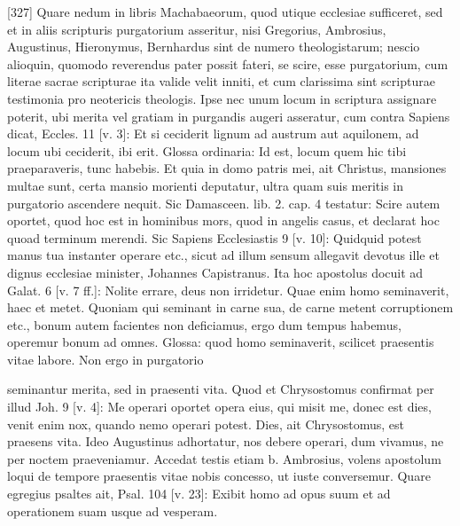 [327] Quare nedum in libris Machabaeorum, quod utique ecclesiae sufficeret, sed et in aliis scripturis purgatorium asseritur, nisi Gregorius, Ambrosius, Augustinus, Hieronymus, Bernhardus sint de numero theologistarum; nescio alioquin, quomodo reverendus pater possit fateri, se scire, esse purgatorium, cum literae sacrae scripturae ita valide velit inniti, et cum clarissima sint scripturae testimonia pro neotericis theologis. Ipse nec unum locum in scriptura assignare poterit, ubi merita vel gratiam in purgandis augeri asseratur, cum contra Sapiens dicat, Eccles. 11 [v. 3]: Et si ceciderit lignum ad austrum aut aquilonem, ad locum ubi ceciderit, ibi erit. Glossa ordinaria: Id est, locum quem hic tibi praeparaveris, tunc habebis. Et quia in domo patris mei, ait Christus, mansiones multae sunt, certa mansio morienti deputatur, ultra quam suis meritis in purgatorio ascendere nequit. Sic Damasceen. lib. 2. cap. 4 testatur: Scire autem oportet, quod hoc est in hominibus mors, quod in angelis casus, et declarat hoc quoad terminum merendi. Sic Sapiens Ecclesiastis 9 [v. 10]: Quidquid potest manus tua instanter operare etc., sicut ad illum sensum allegavit devotus ille et dignus ecclesiae minister, Johannes Capistranus. Ita hoc apostolus docuit ad Galat. 6 [v. 7 ff.]: Nolite errare, deus non irridetur. Quae enim homo seminaverit, haec et metet. Quoniam qui seminant in carne sua, de carne metent corruptionem etc., bonum autem facientes non deficiamus, ergo dum tempus habemus, operemur bonum ad omnes. Glossa: quod homo seminaverit, scilicet praesentis vitae labore. Non ergo in purgatorio

seminantur merita, sed in praesenti vita. Quod et Chrysostomus confirmat per illud Joh. 9 [v. 4]: Me operari oportet opera eius, qui misit me, donec est dies, venit enim nox, quando nemo operari potest. Dies, ait Chrysostomus, est praesens vita. Ideo Augustinus adhortatur, nos debere operari, dum vivamus, ne per noctem praeveniamur. Accedat testis etiam b. Ambrosius, volens apostolum loqui de tempore praesentis vitae nobis concesso, ut iuste conversemur. Quare egregius psaltes ait, Psal. 104 [v. 23]: Exibit homo ad opus suum et ad operationem suam usque ad vesperam.

